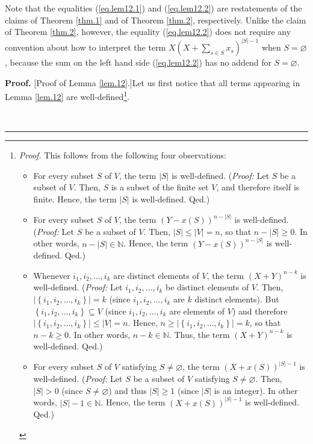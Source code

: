 \documentclass[numbers=enddot,12pt,final,onecolumn,notitlepage]{scrartcl}%
\theoremstyle{definition}
\newenvironment{proof}[1][Proof]{\noindent\textbf{#1.} }{\ \rule{0.5em}{0.5em}}
\let\sumnonlimits\sum
\renewcommand{\sum}{\sumnonlimits\limits}
\newenvironment{verlong}{}{}
\begin{document}
\begin{verlong}
Note that the equalities (\ref{eq.lem12.1}) and (\ref{eq.lem12.2}) are
restatements of the claims of Theorem \ref{thm.1} and of Theorem \ref{thm.2},
respectively. Unlike the claim of Theorem \ref{thm.2}, however, the equality
(\ref{eq.lem12.2}) does not require any convention about how to interpret the
term $X\left(  X+\sum_{s\in S}x_{s}\right)  ^{\left\vert S\right\vert -1}$
when $S=\varnothing$, because the sum on the left hand side (\ref{eq.lem12.2})
has no addend for $S=\varnothing$.

\begin{proof}
[Proof of Lemma \ref{lem.12}.]Let us first notice that all terms appearing in
Lemma \ref{lem.12} are well-defined\footnote{\textit{Proof.} This follows from
the following four observations:
\par
\begin{itemize}
\item For every subset $S$ of $V$, the term $\left\vert S\right\vert $ is
well-defined. (\textit{Proof:} Let $S$ be a subset of $V$. Then, $S$ is a
subset of the finite set $V$, and therefore itself is finite. Hence, the term
$\left\vert S\right\vert $ is well-defined. Qed.)
\par
\item For every subset $S$ of $V$, the term $\left(  Y-x\left(  S\right)
\right)  ^{n-\left\vert S\right\vert }$ is well-defined. (\textit{Proof:} Let
$S$ be a subset of $V$. Then, $\left\vert S\right\vert \leq\left\vert
V\right\vert =n$, so that $n-\left\vert S\right\vert \geq0$. In other words,
$n-\left\vert S\right\vert \in\mathbb{N}$. Hence, the term $\left(  Y-x\left(
S\right)  \right)  ^{n-\left\vert S\right\vert }$ is well-defined. Qed.)
\par
\item Whenever $i_{1},i_{2},\ldots,i_{k}$ are distinct elements of $V$, the
term $\left(  X+Y\right)  ^{n-k}$ is well-defined. (\textit{Proof:} Let
$i_{1},i_{2},\ldots,i_{k}$ be distinct elements of $V$. Then, $\left\vert
\left\{  i_{1},i_{2},\ldots,i_{k}\right\}  \right\vert =k$ (since $i_{1}%
,i_{2},\ldots,i_{k}$ are $k$ distinct elements). But $\left\{  i_{1}%
,i_{2},\ldots,i_{k}\right\}  \subseteq V$ (since $i_{1},i_{2},\ldots,i_{k}$
are elements of $V$) and therefore $\left\vert \left\{  i_{1},i_{2}%
,\ldots,i_{k}\right\}  \right\vert \leq\left\vert V\right\vert =n$. Hence,
$n\geq\left\vert \left\{  i_{1},i_{2},\ldots,i_{k}\right\}  \right\vert =k$,
so that $n-k\geq0$. In other words, $n-k\in\mathbb{N}$. Thus, the term
$\left(  X+Y\right)  ^{n-k}$ is well-defined. Qed.)
\par
\item For every subset $S$ of $V$ satisfying $S\neq\varnothing$, the term
$\left(  X+x\left(  S\right)  \right)  ^{\left\vert S\right\vert -1}$ is
well-defined. (\textit{Proof:} Let $S$ be a subset of $V$ satisfying
$S\neq\varnothing$. Then, $\left\vert S\right\vert >0$ (since $S\neq
\varnothing$) and thus $\left\vert S\right\vert \geq1$ (since $\left\vert
S\right\vert $ is an integer). In other words, $\left\vert S\right\vert
-1\in\mathbb{N}$. Hence, the term $\left(  X+x\left(  S\right)  \right)
^{\left\vert S\right\vert -1}$ is well-defined. Qed.)
\end{itemize}
}.


\end{proof}
\end{verlong}
\end{document}
